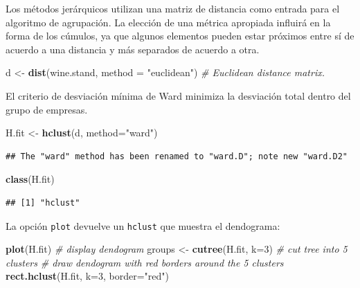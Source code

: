\documentclass[]{book}
\newenvironment{Shaded}{\begin{snugshade}}{\end{snugshade}}
\newcommand{\KeywordTok}[1]{\textcolor[rgb]{0.13,0.29,0.53}{\textbf{#1}}}
\newcommand{\DataTypeTok}[1]{\textcolor[rgb]{0.13,0.29,0.53}{#1}}
\newcommand{\DecValTok}[1]{\textcolor[rgb]{0.00,0.00,0.81}{#1}}
\newcommand{\StringTok}[1]{\textcolor[rgb]{0.31,0.60,0.02}{#1}}
\newcommand{\CommentTok}[1]{\textcolor[rgb]{0.56,0.35,0.01}{\textit{#1}}}
\newcommand{\NormalTok}[1]{#1}
\begin{document}
Los métodos jerárquicos utilizan una matriz de distancia como entrada
para el algoritmo de agrupación. La elección de una métrica apropiada
influirá en la forma de los cúmulos, ya que algunos elementos pueden
estar próximos entre sí de acuerdo a una distancia y más separados de
acuerdo a otra.

\begin{Shaded}
\begin{Highlighting}[]
\NormalTok{d <-}\StringTok{ }\KeywordTok{dist}\NormalTok{(wine.stand, }\DataTypeTok{method =} \StringTok{"euclidean"}\NormalTok{) }\CommentTok{# Euclidean distance matrix.}
\end{Highlighting}
\end{Shaded}

El criterio de desviación mínima de Ward minimiza la desviación total
dentro del grupo de empresas.

\begin{Shaded}
\begin{Highlighting}[]
\NormalTok{H.fit <-}\StringTok{ }\KeywordTok{hclust}\NormalTok{(d, }\DataTypeTok{method=}\StringTok{"ward"}\NormalTok{)}
\end{Highlighting}
\end{Shaded}

\begin{verbatim}
## The "ward" method has been renamed to "ward.D"; note new "ward.D2"
\end{verbatim}

\begin{Shaded}
\begin{Highlighting}[]
\KeywordTok{class}\NormalTok{(H.fit)}
\end{Highlighting}
\end{Shaded}

\begin{verbatim}
## [1] "hclust"
\end{verbatim}

La opción \texttt{plot} devuelve un \texttt{hclust} que muestra el
dendograma:

\begin{Shaded}
\begin{Highlighting}[]
\KeywordTok{plot}\NormalTok{(H.fit) }\CommentTok{# display dendogram}
\NormalTok{groups <-}\StringTok{ }\KeywordTok{cutree}\NormalTok{(H.fit, }\DataTypeTok{k=}\DecValTok{3}\NormalTok{) }\CommentTok{# cut tree into 5 clusters}
\CommentTok{# draw dendogram with red borders around the 5 clusters}
\KeywordTok{rect.hclust}\NormalTok{(H.fit, }\DataTypeTok{k=}\DecValTok{3}\NormalTok{, }\DataTypeTok{border=}\StringTok{"red"}\NormalTok{)}
\end{Highlighting}
\end{Shaded}
\end{document}
